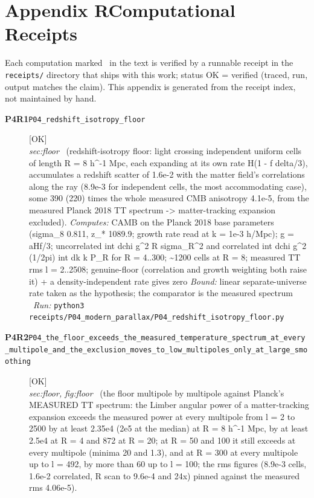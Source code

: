 \clearpage
\section*{Appendix R\quad Computational Receipts}\label{app:receipts}
\small\noindent Each computation marked \rcptmarker\ in the text is verified by a runnable receipt in the \texttt{receipts/} directory that ships with this work; status \textsf{OK} = verified (traced, run, output matches the claim). This appendix is generated from the receipt index, not maintained by hand.\par\medskip
\begingroup\renewcommand{\arraystretch}{1.25}
\begin{description}
\item[\textbf{P4R1}\quad\texttt{P04\_redshift\_isotropy\_floor}]\hfill\textsf{[OK]}\\
\textit{sec:floor} \ (redshift-isotropy floor: light crossing independent uniform cells of length R = 8 h\textasciicircum{}-1 Mpc, each expanding at its own rate H(1 - f delta/3), accumulates a redshift scatter of 1.6e-2 with the matter field's correlations along the ray (8.9e-3 for independent cells, the most accommodating case), some 390 (220) times the whole measured CMB anisotropy 4.1e-5, from the measured Planck 2018 TT spectrum -> matter-tracking expansion excluded). 
\emph{Computes:} CAMB on the Planck 2018 base parameters (sigma\_8 0.811, z\_* 1089.9; growth rate read at k = 1e-3 h/Mpc); g = aHf/3; uncorrelated int dchi g\textasciicircum{}2 R sigma\_R\textasciicircum{}2 and correlated int dchi g\textasciicircum{}2 (1/2pi) int dk k P\_R for R = 4..300; \textasciitilde{}1200 cells at R = 8; measured TT rms l = 2..2508; genuine-floor (correlation and growth weighting both raise it) + a density-independent rate gives zero
 \emph{Bound:} linear separate-universe rate taken as the hypothesis; the comparator is the measured spectrum
\ \emph{Run:} \texttt{python3 receipts/P04\_modern\_parallax/P04\_redshift\_isotropy\_floor.py}
\item[\textbf{P4R2}\quad\texttt{P04\_the\_floor\_exceeds\_the\_measured\_temperature\_spectrum\_at\_every\_multipole\_and\_the\_exclusion\_moves\_to\_low\_multipoles\_only\_at\_large\_smoothing}]\hfill\textsf{[OK]}\\
\textit{sec:floor, fig:floor} \ (the floor multipole by multipole against Planck's MEASURED TT spectrum: the Limber angular power of a matter-tracking expansion exceeds the measured power at every multipole from l = 2 to 2500 by at least 2.35e4 (2e5 at the median) at R = 8 h\textasciicircum{}-1 Mpc, by at least 2.5e4 at R = 4 and 872 at R = 20; at R = 50 and 100 it still exceeds at every multipole (minima 20 and 1.3), and at R = 300 at every multipole up to l = 492, by more than 60 up to l = 100; the rms figures (8.9e-3 cells, 1.6e-2 correlated, R scan to 9.6e-4 and 24x) pinned against the measured rms 4.06e-5). 

\end{description}
